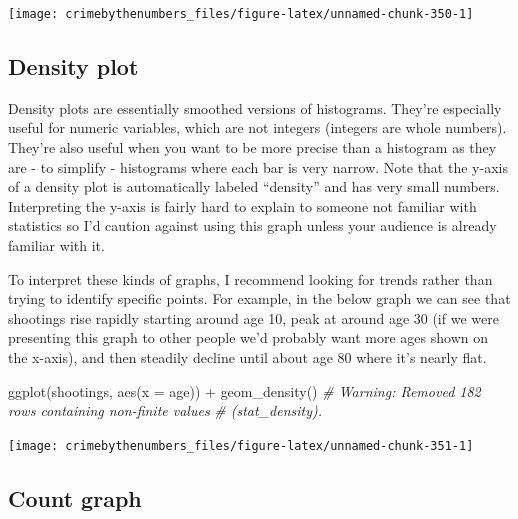 \documentclass[
  a4paper,
]{krantz}
\makeatletter
\newenvironment{Shaded}{\begin{snugshade}}{\end{snugshade}}
\newcommand{\AttributeTok}[1]{\textcolor[rgb]{0.61,0.61,0.61}{#1}}
\newcommand{\CommentTok}[1]{\textcolor[rgb]{0.37,0.37,0.37}{\textit{#1}}}
\newcommand{\FunctionTok}[1]{\textcolor[rgb]{0,0,0}{#1}}
\newcommand{\NormalTok}[1]{#1}
\newcommand{\SpecialCharTok}[1]{\textcolor[rgb]{0,0,0}{#1}}
\newenvironment{kframe}{%
\medskip{}
\setlength{\fboxsep}{.8em}
 \def\at@end@of@kframe{}%
 \ifinner\ifhmode%
  \def\at@end@of@kframe{\end{minipage}}%
  \begin{minipage}{\columnwidth}%
 \fi\fi%
 \def\FrameCommand##1{\hskip\@totalleftmargin \hskip-\fboxsep
 \colorbox{shadecolor}{##1}\hskip-\fboxsep
     \hskip-\linewidth \hskip-\@totalleftmargin \hskip\columnwidth}%
 \MakeFramed {\advance\hsize-\width
   \@totalleftmargin\z@ \linewidth\hsize
   \@setminipage}}%
 {\par\unskip\endMakeFramed%
 \at@end@of@kframe}
\renewenvironment{Shaded}{\begin{kframe}}{\end{kframe}}
\makeatother
\begin{document}
\begin{center}\texttt{[image: crimebythenumbers\_files/figure-latex/unnamed-chunk-350-1]} \end{center}

\hypertarget{density-plot}{%
\subsection{Density plot}\label{density-plot}}

Density plots are essentially smoothed versions of
histograms. They're especially useful for numeric variables,
which are not integers (integers are whole numbers). They're
also useful when you want to be more precise than a
histogram as they are - to simplify - histograms where each
bar is very narrow. Note that the y-axis of a density plot
is automatically labeled ``density'' and has very small
numbers. Interpreting the y-axis is fairly hard to explain
to someone not familiar with statistics so I'd caution
against using this graph unless your audience is already
familiar with it.

To interpret these kinds of graphs, I recommend looking for
trends rather than trying to identify specific points. For
example, in the below graph we can see that shootings rise
rapidly starting around age 10, peak at around age 30 (if we
were presenting this graph to other people we'd probably
want more ages shown on the x-axis), and then steadily
decline until about age 80 where it's nearly flat.

\begin{Shaded}
\begin{Highlighting}[]
\FunctionTok{ggplot}\NormalTok{(shootings, }\FunctionTok{aes}\NormalTok{(}\AttributeTok{x =}\NormalTok{ age)) }\SpecialCharTok{+}
  \FunctionTok{geom\_density}\NormalTok{()}
\CommentTok{\# Warning: Removed 182 rows containing non{-}finite values}
\CommentTok{\# (stat\_density).}
\end{Highlighting}
\end{Shaded}

\begin{center}\texttt{[image: crimebythenumbers\_files/figure-latex/unnamed-chunk-351-1]} \end{center}

\hypertarget{count-graph}{%
\subsection{Count graph}\label{count-graph}}
\end{document}
